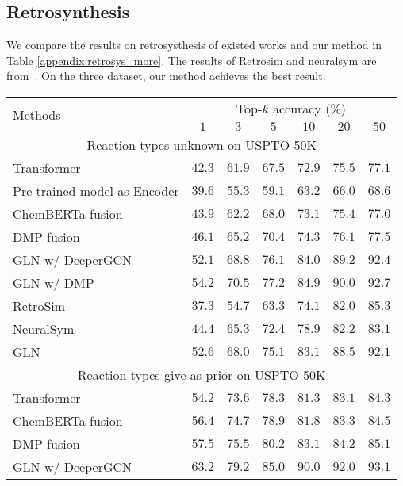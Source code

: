 \documentclass{article}
\newcommand{\ourM}{DMP}
\begin{document}
\subsection{Retrosynthesis}\label{appendix:retrosys}
We compare the results on retrosysthesis of existed works and our method in Table \ref{appendix:retrosys_more}. The results of Retrosim and neuralsym are from~\cite{GLN}.
On the three dataset, our method achieves the best result. 
\begin{table}[!htb]
\small
    \centering
    \begin{tabular}{lcccccc}
    \toprule
         \multirow{2}{*}{Methods} & \multicolumn{6}{c}{Top-$k$ accuracy (\%)}  \\
         \cmidrule{2-7}
         & $1$& $3$ & $5$& $10$&$20$ & $50$\\
         \midrule
         \multicolumn{7}{c}{Reaction types unknown on USPTO-50K}\\
         \midrule
         Transformer & $42.3$ & $61.9$ & $67.5$ & $72.9$ & $75.5$ & $77.1$ \\
         Pre-trained model as Encoder& $39.6$&$55.3$&$59.1$&$63.2$&$66.0$&$68.6$\\
          ChemBERTa fusion \cite{chithrananda2020chemberta}&$43.9$&$62.2$&$68.0$&$73.1$&$75.4$&$77.0$\\
         \ourM{} fusion &$46.1$&$65.2$&$70.4$&$74.3$&$76.1$&$77.5$ \\
          GLN w/ DeeperGCN & $52.1$ & $68.8$&$76.1$&$84.0$&$89.2$&$92.4$\\
         GLN w/ \ourM{}  &$54.2$&$70.5$&$77.2$&$84.9$&$90.0$&$92.7$\\
         \midrule
         RetroSim & $37.3$ &$54.7$& $63.3$&$74.1$&$82.0$&$85.3$ \\
         NeuralSym & $44.4$&$65.3$&$72.4$&$78.9$&$82.2$&$83.1$ \\
         GLN~\cite{GLN}&$52.6$&$68.0$&$75.1$&$83.1$&$88.5$&$92.1$\\
         \midrule
         \multicolumn{7}{c}{Reaction types give as prior on USPTO-50K}\\
         \midrule
         Transformer & $54.2$ & $73.6$ & $78.3$&$81.3$& $83.1$&$84.3$ \\
          ChemBERTa fusion \cite{chithrananda2020chemberta}&$56.4$&$74.7$&$78.9$&$81.8$&$83.3$&$84.5$\\
          \ourM{} fusion  &$57.5$&$75.5$&$80.2$&$83.1$&$84.2$&$85.1$\\
GLN w/ DeeperGCN & $63.2$ & $79.2$&$85.0$&$90.0$&$92.0$&$93.1$\\

\end{tabular}
\end{table}
\end{document}
